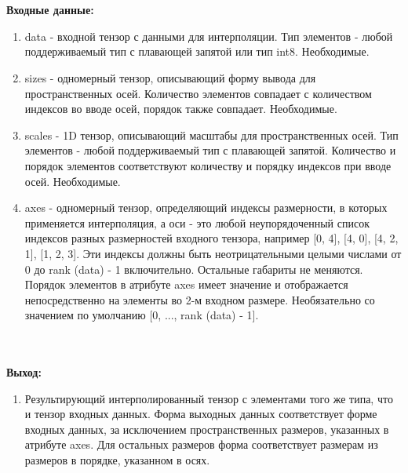 \documentclass{article}
\begin{document}
\\ \\ 
\textbf{Входные данные:}\\
    \begin{enumerate}
        \item data - входной тензор с данными для интерполяции. Тип элементов - любой поддерживаемый тип с плавающей запятой или тип int8. Необходимые.\\

        \item sizes - одномерный тензор, описывающий форму вывода для пространственных осей. Количество элементов совпадает с количеством индексов во вводе осей, порядок также совпадает. Необходимые.\\

        \item scales - 1D тензор, описывающий масштабы для пространственных осей. Тип элементов - любой поддерживаемый тип с плавающей запятой. Количество и порядок элементов соответствуют количеству и порядку индексов при вводе осей. Необходимые.\\

        \item axes - одномерный тензор, определяющий индексы размерности, в которых применяется интерполяция, а оси - это любой неупорядоченный список индексов разных размерностей входного тензора, например [0, 4], [4, 0], [4, 2, 1], [1, 2, 3]. Эти индексы должны быть неотрицательными целыми числами от 0 до rank (data) - 1 включительно. Остальные габариты не меняются. Порядок элементов в атрибуте axes имеет значение и отображается непосредственно на элементы во 2-м входном размере. Необязательно со значением по умолчанию [0, ..., rank (data) - 1].\\
    \end{enumerate}
\\ \\ 
\textbf{Выход:}\\
    \begin{enumerate}
        \item Результирующий интерполированный тензор с элементами того же типа, что и тензор входных данных. Форма выходных данных соответствует форме входных данных, за исключением пространственных размеров, указанных в атрибуте axes. Для остальных размеров форма соответствует размерам из размеров в порядке, указанном в осях.
    \end{enumerate}
    
    
\end{document}
